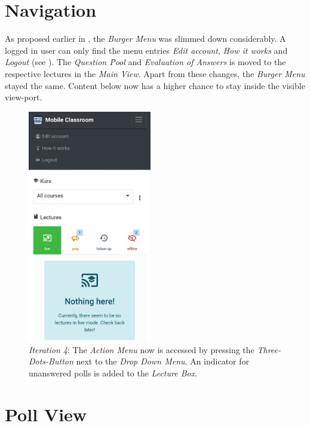 \section{Navigation}
As proposed earlier in , the \emph{Burger Menu} was slimmed down considerably. A logged in user can only find the menu entries \emph{Edit account}, \emph{How it works} and \emph{Logout} (see ).
The \emph{Question Pool} and \emph{Evaluation of Answers} is moved to the respective lectures in the \emph{Main View}. Apart from these changes, the \emph{Burger Menu} stayed the same. Content below now has a higher chance to stay inside the visible view-port.

\begin{figure}
	\vspace*{-1cm}
	\begin{center}
		\includegraphics[width=0.48\textwidth]{screenshots/redesign/navigation_new.jpg}
	\end{center}
	\caption{\emph{Iteration 4}: The \emph{Action Menu} now is accessed by pressing the \emph{Three-Dots-Button} next to the \emph{Drop Down Menu}. An indicator for unanswered polls is added to the \emph{Lecture Box}.}
	\label{fig:navigation}
\end{figure}

\section{Poll View}

